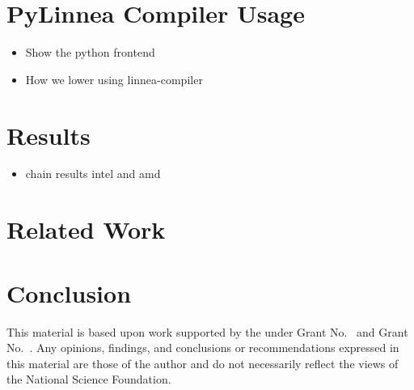 \documentclass[conference]{IEEEtran}
\begin{document}
\section{PyLinnea Compiler Usage}
\begin{itemize}
  \item Show the python frontend
  \item How we lower using linnea-compiler
\end{itemize}

\section{Results}
\begin{itemize}
  \item chain results intel and amd
\end{itemize}

\section{Related Work}

\section{Conclusion}
\lipsum[1]

\ifx\paperversion\paperversioncameraIEEE
\else
\begin{acks}                            %
  This material is based upon work supported by the
   under Grant
  No.~ and Grant
  No.~.  Any opinions, findings, and
  conclusions or recommendations expressed in this material are those
  of the author and do not necessarily reflect the views of the
  National Science Foundation.
\end{acks}
\fi

%
\end{document}
